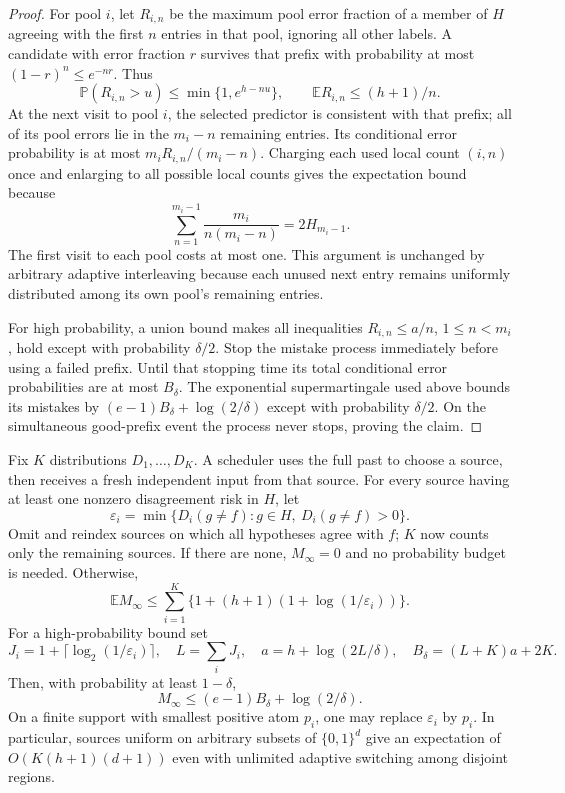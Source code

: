 \begin{proof}
For pool $i$, let $R_{i,n}$ be the maximum pool error fraction of a member
of $H$ agreeing with the first $n$ entries in that pool, ignoring all other
labels. A candidate with error fraction $r$ survives that prefix with
probability at most $(1-r)^n\le e^{-nr}$. Thus
\[
 \mathbb P(R_{i,n}>u)\le\min\{1,e^{h-nu}\},
 \qquad \mathbb E R_{i,n}\le(h+1)/n.
\]
At the next visit to pool $i$, the selected predictor is consistent with
that prefix; all of its pool errors lie in the $m_i-n$ remaining entries.
Its conditional error probability is at most
$m_iR_{i,n}/(m_i-n)$. Charging each used local count $(i,n)$ once and
enlarging to all possible local counts gives the expectation bound because
\[
 \sum_{n=1}^{m_i-1}\frac{m_i}{n(m_i-n)}=2H_{m_i-1}.
\]
The first visit to each pool costs at most one. This argument is unchanged
by arbitrary adaptive interleaving because each unused next entry remains
uniformly distributed among its own pool's remaining entries.

For high probability, a union bound makes all inequalities
$R_{i,n}\le a/n$, $1\le n<m_i$, hold except with probability $\delta/2$.
Stop the mistake process immediately before using a failed prefix. Until
that stopping time its total conditional error probabilities are at most
$B_\delta$. The exponential supermartingale used above bounds its mistakes
by $(e-1)B_\delta+\log(2/\delta)$ except with probability $\delta/2$.
On the simultaneous good-prefix event the process never stops, proving
the claim.
\end{proof}

\begin{theorem}
Fix $K$ distributions $D_1,\ldots,D_K$. A scheduler uses the full past to
choose a source, then receives a fresh independent input from that source.
For every source having at least one nonzero disagreement risk in $H$, let
\[
 \varepsilon_i=
 \min\{D_i(g\ne f):g\in H,\ D_i(g\ne f)>0\}.
\]
Omit and reindex sources on which all hypotheses agree with $f$; $K$
now counts only the remaining sources. If there are none, $M_\infty=0$
and no probability budget is needed. Otherwise,
\[
 \mathbb E M_\infty\le
 \sum_{i=1}^K\{1+(h+1)(1+\log(1/\varepsilon_i))\}.
\]
For a high-probability bound set
\[
 J_i=1+\lceil\log_2(1/\varepsilon_i)\rceil,\quad
 L=\sum_iJ_i,\quad a=h+\log(2L/\delta),\quad
 B_\delta=(L+K)a+2K.
\]
Then, with probability at least $1-\delta$,
\[
 M_\infty\le(e-1)B_\delta+\log(2/\delta).
\]
On a finite support with smallest positive atom $p_i$, one may replace
$\varepsilon_i$ by $p_i$. In particular, sources uniform on arbitrary
subsets of $\{0,1\}^d$ give an expectation of $O(K(h+1)(d+1))$ even with
unlimited adaptive switching among disjoint regions.
\end{theorem}

